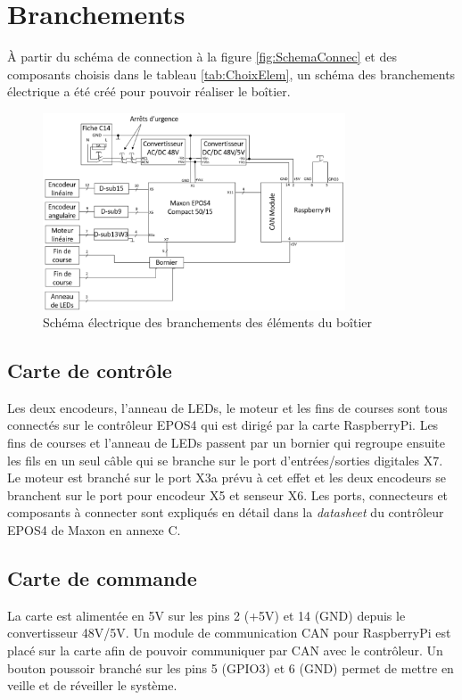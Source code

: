 \section{Branchements}\label{sec:Branche}

À partir du schéma de connection à la figure \ref{fig:SchemaConnec} et des composants choisis dans le tableau \ref{tab:ChoixElem}, un schéma
des branchements électrique a été créé pour pouvoir réaliser le boîtier.

\begin{figure}[H]
  \centering
  \includegraphics[width = 0.8\textwidth]{assets/figures/SchemaElectrique.svg}
  \caption{Schéma électrique des branchements des éléments du boîtier}
  \label{fig:SchemaElec}
\end{figure}

\subsection{Carte de contrôle}
Les deux encodeurs, l'anneau de LEDs, le moteur et les fins de courses sont tous connectés sur le contrôleur EPOS4 qui est dirigé par la carte
RaspberryPi. Les fins de courses et l'anneau de LEDs passent par un bornier qui regroupe ensuite les fils en un seul câble qui se branche
sur le port d'entrées/sorties digitales X7. Le moteur est branché sur le port X3a prévu à cet effet et les deux encodeurs se branchent sur
le port pour encodeur X5 et senseur X6. Les ports, connecteurs et composants à connecter sont expliqués en détail dans la \textit{datasheet}
du contrôleur EPOS4 de Maxon \cite{Maxon} en annexe C.

\subsection{Carte de commande}

La carte est alimentée en 5V sur les pins 2 (+5V) et 14 (GND) depuis le convertisseur 48V/5V. Un module de communication CAN pour RaspberryPi est
placé sur la carte afin de pouvoir communiquer par CAN avec le contrôleur. Un bouton poussoir branché sur les pins 5 (GPIO3) et 6 (GND) permet de
mettre en veille et de réveiller le système.
